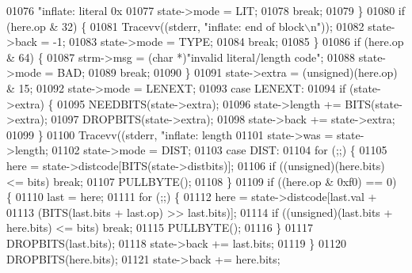 \begin{DoxyCode}
{{{{{{{{{01076                         \textcolor{stringliteral}{"inflate:         literal 0x%
01077                 state->mode = LIT;
01078                 \textcolor{keywordflow}{break};
01079             \}
01080             \textcolor{keywordflow}{if} (here.op & 32) \{
01081                 Tracevv((stderr, \textcolor{stringliteral}{"inflate:         end of block\(\backslash\)n"}));
01082                 state->back = -1;
01083                 state->mode = TYPE;
01084                 \textcolor{keywordflow}{break};
01085             \}
01086             \textcolor{keywordflow}{if} (here.op & 64) \{
01087                 strm->msg = (\textcolor{keywordtype}{char} *)\textcolor{stringliteral}{"invalid literal/length code"};
01088                 state->mode = BAD;
01089                 \textcolor{keywordflow}{break};
01090             \}
01091             state->extra = (unsigned)(here.op) & 15;
01092             state->mode = LENEXT;
01093         \textcolor{keywordflow}{case} LENEXT:
01094             \textcolor{keywordflow}{if} (state->extra) \{
01095                 NEEDBITS(state->extra);
01096                 state->length += BITS(state->extra);
01097                 DROPBITS(state->extra);
01098                 state->back += state->extra;
01099             \}
01100             Tracevv((stderr, \textcolor{stringliteral}{"inflate:         length %
01101             state->was = state->length;
01102             state->mode = DIST;
01103         \textcolor{keywordflow}{case} DIST:
01104             \textcolor{keywordflow}{for} (;;) \{
01105                 here = state->distcode[BITS(state->distbits)];
01106                 \textcolor{keywordflow}{if} ((\textcolor{keywordtype}{unsigned})(here.bits) <= bits) \textcolor{keywordflow}{break};
01107                 PULLBYTE();
01108             \}
01109             \textcolor{keywordflow}{if} ((here.op & 0xf0) == 0) \{
01110                 last = here;
01111                 \textcolor{keywordflow}{for} (;;) \{
01112                     here = state->distcode[last.val +
01113                             (BITS(last.bits + last.op) >> last.bits)];
01114                     \textcolor{keywordflow}{if} ((\textcolor{keywordtype}{unsigned})(last.bits + here.bits) <= bits) \textcolor{keywordflow}{break};
01115                     PULLBYTE();
01116                 \}
01117                 DROPBITS(last.bits);
01118                 state->back += last.bits;
01119             \}
01120             DROPBITS(here.bits);
01121             state->back += here.bits;
}}}}}}}}}}}
\end{DoxyCode}
